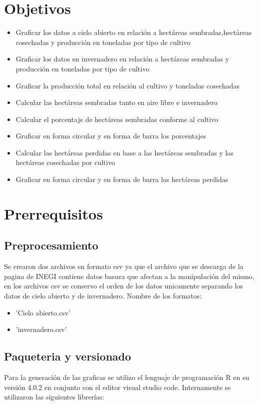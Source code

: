 \documentclass{article}
\begin{document}
\section{Objetivos}
\begin{itemize}
  \item Graficar los datos a cielo abierto en relación a hectáreas sembradas,hectáreas cosechadas y producción en toneladas por tipo de cultivo
  \item Graficar los datos en invernadero en relación a hectáreas sembradas y  producción en toneladas por tipo de cultivo
  \item Graficar la producción total en relación al cultivo y toneladas cosechadas
  \item Calcular las hectáreas sembradas tanto en aire libre e invernadero
  \item Calcular  el porcentaje de hectáreas sembradas conforme al cultivo
  \item Graficar en forma circular y en forma de barra los porcentajes
  \item Calcular las hectáreas perdidas en base a las hectáreas sembradas y las hectáreas cosechadas  por cultivo
  \item Graficar en forma circular y en forma de barra las hectáreas perdidas 
\end{itemize}

\section{Prerrequisitos}
\subsection{Preprocesamiento}
Se crearon dos archivos en formato csv ya que el archivo que se descarga de la pagina de INEGI\citep{INEGI} contiene datos basura que afectan a la manipulación del mismo, en los archivos csv se conservo el orden de los datos unicamente separando los datos de cielo abierto y de invernadero.\newline
Nombre de los formatos:
\begin{itemize}
    \item 'Cielo abierto.csv'
    \item 'invernadero.csv'
\end{itemize}

\subsection{Paqueteria y versionado}
Para la generación de las graficas se utilizo el lenguaje de programación R en su versión 4.0.2\citep{LR} en conjunto con el editor visual studio code\citep{VS-code}. \newline
Internamente se utilizaron las siguientes librerías:
\end{document}
